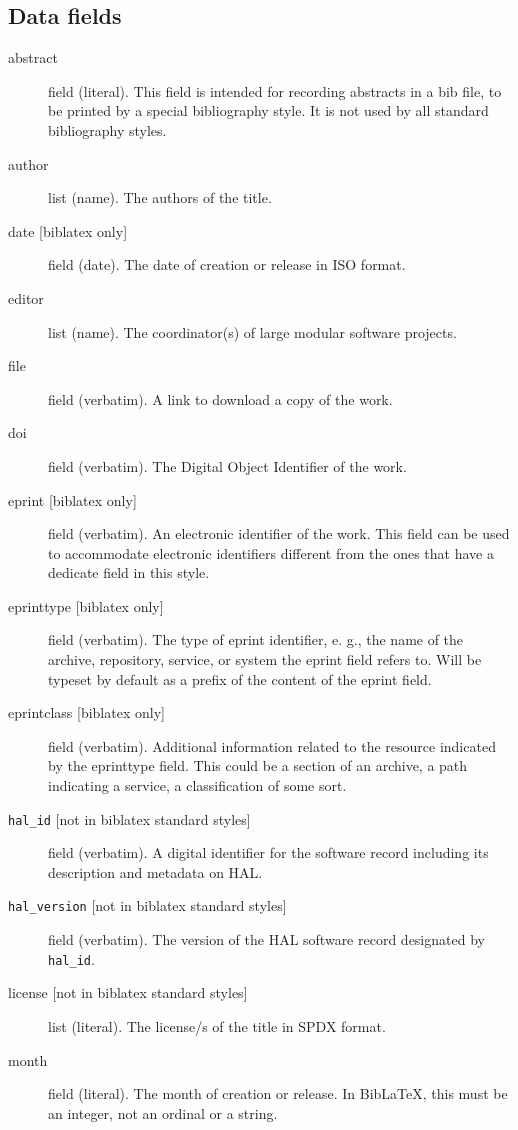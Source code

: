 \subsection{Data fields}
\begin{description}
\item[{abstract}] field (literal). This field is intended for recording 
abstracts in a bib file, to be printed by a special bibliography 
style. It is not used by all standard bibliography styles.
\item[{author}] list (name). The authors of the title.
\item[{date [biblatex only]}] field (date). The date of creation or release in ISO format.
\item[{editor}] list (name). The coordinator(s) of large modular software projects.
\item[{file}] field (verbatim). A link to download a copy of the work.
\item[{doi}] field (verbatim). The Digital Object Identifier of the work.
\item[{eprint [biblatex only]}] field (verbatim). An electronic identifier of the work. This field can be used to accommodate electronic identifiers different from the ones that have a dedicate field in this style.
\item[{eprinttype [biblatex only]}] field (verbatim). The type of eprint identifier, e. g., the name of the archive, repository, service, or system the eprint field refers to. Will be typeset by default as a prefix of the content of the eprint field.
\item[{eprintclass [biblatex only]}] field (verbatim). Additional information related to the resource indicated by the eprinttype field. This could be a section of an archive, a path indicating a service, a classification of some sort.
\item[{\texttt{hal\_id} [not in biblatex standard styles]}] field (verbatim). A digital identifier for the 
software record including its description and metadata on HAL.
\item[{\texttt{hal\_version} [not in biblatex standard styles]}] field (verbatim). The version of the HAL software record designated by \texttt{hal\_id}.
\item[{license [not in biblatex standard styles]}] list (literal). The license/s of the title 
in SPDX format.
\item[{month}] field (literal). The month of creation or release. 
In BibLaTeX, this must be an integer, not an ordinal or a string.

\end{description}
